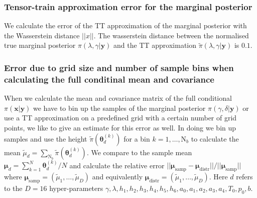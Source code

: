 \subsubsection{Tensor-train approximation error for the marginal posterior}
We calculate the error of the TT approximation of the marginal posterior with the Wasserstein distance $||x||$.
The wasserstein distance between the normalised true marginal posterior $\pi(\lambda,\gamma|\bm{y})$ and the TT approximation $\tilde{\pi}(\lambda,\gamma|\bm{y})$ is $0.1$.


\subsubsection{Error due to grid size and number of sample bins when calculating the full conditinal mean and covariance}
When we calculate the mean and covariance matrix of the full conditional $\pi(\bm{x}|\bm{y})$ we have to bin up the samples of the marginal posterior $\pi(\gamma, \delta |\bm{y})$ or use a TT approximation on a predefined grid with a certain number of grid points, we like to give an estimate for this error as well.
In doing we bin up samples and use the height $\tilde{\pi}(\bm{\theta}^{(k)}_d)$ for a bin $k = 1, \dots, \text{N}_b$ to calculate the mean $\tilde{\mu}_d = \sum_{\text{N}_b} \tilde{\pi}(\bm{\theta}^{(k)}_d) $.
We compare to the sample mean $\bm{\mu}_d = \sum_{k=1}^N \bm{\theta}^{(k)}_d/N$ and calculate the relative error $||\bm{\mu}_{\text{samp}} -\bm{\mu}_{\text{distr}} ||/ || \bm{\mu}_{\text{samp}} ||$
where $\bm{\mu}_{\text{samp}} =(\tilde{\mu}_1, \dots , \tilde{\mu}_D) $ and equivalently $\bm{\mu}_{\text{distr}} =(\tilde{\mu}_1, \dots , \tilde{\mu}_D) $.
Here $d$ refers to the $D = 16$ hyper-parameters $\gamma, \lambda, h_1, h_2, h_3, h_4, h_5, h_6, a_0, a_1, a_2, a_3, a_4, T_0, p_0, b$.

